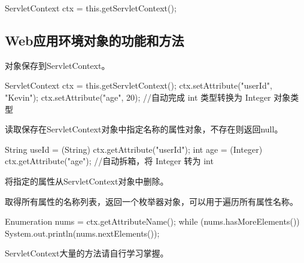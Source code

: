 \begin{javaCode}
  ServletContext ctx = this.getServletContext();
\end{javaCode}


\subsection{Web应用环境对象的功能和方法} 



对象保存到ServletContext。

\begin{javaCode}
  ServletContext ctx = this.getServletContext();
  ctx.setAttribute("userId", "Kevin");
  ctx.setAttribute("age", 20); //自动完成 int 类型转换为 Integer 对象类型
\end{javaCode}


读取保存在ServletContext对象中指定名称的属性对象，不存在则返回null。

\begin{javaCode}
  String useId = (String) ctx.getAttribute("userId");
  int age = (Integer) ctx.getAttribute("age"); //自动拆箱，将 Integer 转为 int
\end{javaCode}



将指定的属性从ServletContext对象中删除。


取得所有属性的名称列表，返回一个枚举器对象，可以用于遍历所有属性名称。
\begin{javaCode}
  Enumeration nums = ctx.getAttributeName();
  while (nums.hasMoreElements()) {
    System.out.println(nums.nextElements());
  }
\end{javaCode}

 ServletContext大量的方法请自行学习掌握。

